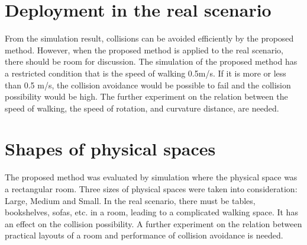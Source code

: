\section{Deployment in the real scenario}
From the simulation result, collisions can be avoided efficiently by the proposed method. However, when the proposed method is applied to the real scenario, there should be room for discussion. The simulation of the proposed method has a restricted condition that is the speed of walking 0.5m/s. If it is more or less than 0.5 m/s, the collision avoidance would be possible to fail and the collision possibility would be high. The further experiment on the relation between the speed of walking, the speed of rotation, and curvature distance, are needed. 
\section{Shapes of physical spaces}
The proposed method was evaluated by simulation where the physical space was a rectangular room. Three sizes of physical spaces were taken into consideration: Large, Medium and Small. In the real scenario, there must be tables, bookshelves, sofas, etc. in a room, leading to a complicated walking space. It has an effect on the collision possibility. A further experiment on the relation between practical layouts of a room and performance of collision avoidance is needed. 
